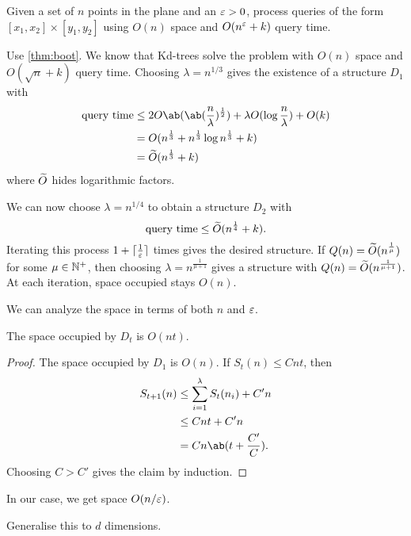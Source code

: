 \begin{question*}
    Given a set of $n$ points in the plane and an $\varepsilon > 0$, process
    queries of the form $[x_1, x_2] \times [y_1, y_2]$ using
    $O(n)$ space and $O(n^{\varepsilon} + k)$ query time.
\end{question*}
\begin{solution}
    Use \cref{thm:boot}.
    We know that Kd-trees solve the problem with $O(n)$ space and
    $O(\sqrt n + k)$ query time.
    Choosing $\lambda = n^{1/3}$ gives the existence of a structure
    $D_1$ with \begin{align*}
        \text{query time} &\le 2 O\ab(\ab(\frac n\lambda)^{\frac12})
            + \lambda O(\log \frac n\lambda) + O(k) \\
        &= O(n^{\frac13} + n^{\frac13} \log n^{\frac13} + k) \\
        &= \wtld{O}(n^{\frac13} + k)
    \end{align*} where $\widetilde{O}$ hides logarithmic factors.

    We can now choose $\lambda = n^{1/4}$ to obtain a structure $D_2$
    with \[
        \text{query time} \le \widetilde O(n^{\frac14} + k).
    \] Iterating this process $1 + \lceil\frac 1{\varepsilon}\rceil$ times gives the
    desired structure.
    If $Q(n) = \widetilde O(n^{\frac1\mu})$ for some $\mu \in \mathbb{N}^+$, then
    choosing $\lambda = n^{\frac1{\mu+1}}$ gives a structure with
    $Q(n) = \widetilde O(n^{\frac1{\mu+1}})$.
    At each iteration, space occupied stays $O(n)$.
\end{solution}
We can analyze the space in terms of both $n$ and $\varepsilon$.
\begin{lemma}
    The space occupied by $D_t$ is $O(nt)$.
\end{lemma}
\begin{proof}
    The space occupied by $D_1$ is $O(n)$.
    If $S_t(n) \le Cnt$, then \begin{align*}
        S_{t+1}(n) &\le \sum_{i=1}^\lambda S_t(n_i) + C'n \\
        &\le Cnt + C'n \\
        &= Cn\ab(t + \frac{C'}{C}).
    \end{align*} Choosing $C > C'$ gives the claim by induction.
\end{proof}
In our case, we get space $O(n/\varepsilon)$.

\begin{exercise*} \label{thm:boot-ors}
    Generalise this to $d$ dimensions.
\end{exercise*}

